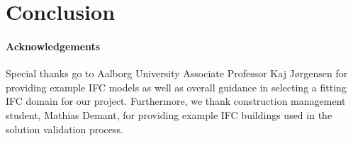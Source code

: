 \section{Conclusion}
\label{sec:conclusion}
\paragraph{Acknowledgements} Special thanks go to Aalborg University Associate Professor Kaj Jørgensen for providing example IFC models as well as overall guidance in selecting a fitting IFC domain for our project. Furthermore, we thank construction management student, Mathias Demant, for providing example IFC buildings used in the solution validation process.